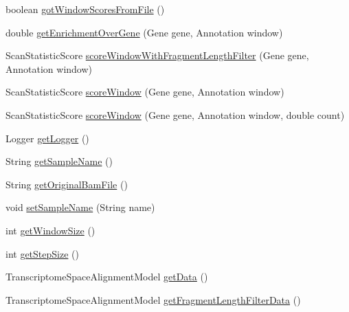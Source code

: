 \begin{DoxyCompactItemize}
$$boolean \hyperlink{classbroad_1_1pda_1_1seq_1_1protection_1_1_sample_data_af69246249c44eabd4349626e639a44c6}{got\+Window\+Scores\+From\+File} ()
\item 
double \hyperlink{classbroad_1_1pda_1_1seq_1_1protection_1_1_sample_data_a2f18a4bad14841ddbb440c21a281703a}{get\+Enrichment\+Over\+Gene} (Gene gene, Annotation window)
\item 
Scan\+Statistic\+Score \hyperlink{classbroad_1_1pda_1_1seq_1_1protection_1_1_sample_data_a477fb361142dde07116598599bb7ef52}{score\+Window\+With\+Fragment\+Length\+Filter} (Gene gene, Annotation window)
\item 
Scan\+Statistic\+Score \hyperlink{classbroad_1_1pda_1_1seq_1_1protection_1_1_sample_data_ac476ccc56fab96d17419127a8cf313a1}{score\+Window} (Gene gene, Annotation window)
\item 
Scan\+Statistic\+Score \hyperlink{classbroad_1_1pda_1_1seq_1_1protection_1_1_sample_data_ae556c14ccb3cb7b63182adf72e3630d7}{score\+Window} (Gene gene, Annotation window, double count)
\item 
Logger \hyperlink{classbroad_1_1pda_1_1seq_1_1protection_1_1_sample_data_ab31cc1f558419ad028782703b015c489}{get\+Logger} ()
\item 
String \hyperlink{classbroad_1_1pda_1_1seq_1_1protection_1_1_sample_data_a9284f2dc44109171457dcc0417d8520a}{get\+Sample\+Name} ()
\item 
String \hyperlink{classbroad_1_1pda_1_1seq_1_1protection_1_1_sample_data_a3a3c58c0def5a809f7949a2f441e815d}{get\+Original\+Bam\+File} ()
\item 
void \hyperlink{classbroad_1_1pda_1_1seq_1_1protection_1_1_sample_data_a77cf4e55d644cb09fa376f9d8b41c538}{set\+Sample\+Name} (String name)
\item 
int \hyperlink{classbroad_1_1pda_1_1seq_1_1protection_1_1_sample_data_ab775331fb5bee8667165c78ca5a105ba}{get\+Window\+Size} ()
\item 
int \hyperlink{classbroad_1_1pda_1_1seq_1_1protection_1_1_sample_data_a225b80f975a281ea6c4d99482a20ba0e}{get\+Step\+Size} ()
\item 
Transcriptome\+Space\+Alignment\+Model \hyperlink{classbroad_1_1pda_1_1seq_1_1protection_1_1_sample_data_a7e1478400941779a43e0776cd90733bb}{get\+Data} ()
\item 
Transcriptome\+Space\+Alignment\+Model \hyperlink{classbroad_1_1pda_1_1seq_1_1protection_1_1_sample_data_a896c9168d0e4ca469e94d60554bdf1d9}{get\+Fragment\+Length\+Filter\+Data} ()
\end{DoxyCompactItemize}
